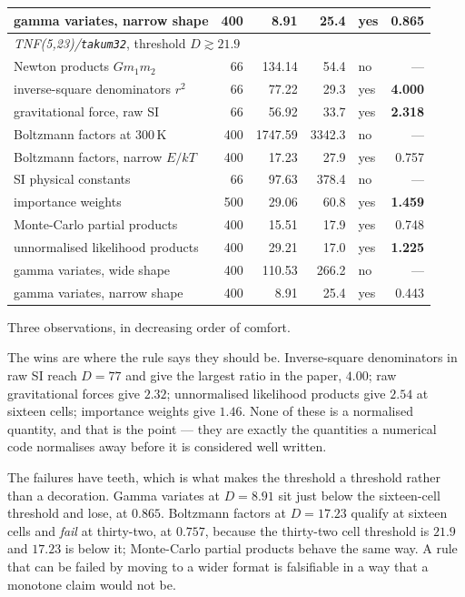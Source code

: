 \documentclass[11pt]{article}
\theoremstyle{definition}
\begin{document}
\begin{table}[htbp]
\begin{tabular}{lrrrlr}
gamma variates, narrow shape & 400 & 8.91 & 25.4 & yes & 0.865 \\
\hline
\multicolumn{6}{l}{\emph{TNF(5,23)/\texttt{takum32}}, threshold $D \gtrsim 21.9$}\\
\hline
Newton products $Gm_1m_2$ & 66 & 134.14 & 54.4 & no & --- \\
inverse-square denominators $r^2$ & 66 & 77.22 & 29.3 & yes & \textbf{4.000} \\
gravitational force, raw SI & 66 & 56.92 & 33.7 & yes & \textbf{2.318} \\
Boltzmann factors at $300$\,K & 400 & 1747.59 & 3342.3 & no & --- \\
Boltzmann factors, narrow $E/kT$ & 400 & 17.23 & 27.9 & yes & 0.757 \\
SI physical constants & 66 & 97.63 & 378.4 & no & --- \\
importance weights & 500 & 29.06 & 60.8 & yes & \textbf{1.459} \\
Monte-Carlo partial products & 400 & 15.51 & 17.9 & yes & 0.748 \\
unnormalised likelihood products & 400 & 29.21 & 17.0 & yes & \textbf{1.225} \\
gamma variates, wide shape & 400 & 110.53 & 266.2 & no & --- \\
gamma variates, narrow shape & 400 & 8.91 & 25.4 & yes & 0.443 \\
\hline
\end{tabular}
\end{table}

Three observations, in decreasing order of comfort.

The wins are where the rule says they should be. Inverse-square denominators in
raw SI reach $D = 77$ and give the largest ratio in the paper, $4.00$; raw
gravitational forces give $2.32$; unnormalised likelihood products give $2.54$ at
sixteen cells; importance weights give $1.46$. None of these is a normalised
quantity, and that is the point --- they are exactly the quantities a numerical
code normalises away before it is considered well written.

The failures have teeth, which is what makes the threshold a threshold rather
than a decoration. Gamma variates at $D = 8.91$ sit just below the sixteen-cell
threshold and lose, at $0.865$. Boltzmann factors at $D = 17.23$ qualify at
sixteen cells and \emph{fail} at thirty-two, at $0.757$, because the thirty-two
cell threshold is $21.9$ and $17.23$ is below it; Monte-Carlo partial products
behave the same way. A rule that can be failed by moving to a wider format is
falsifiable in a way that a monotone claim would not be.
\end{document}
